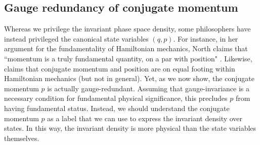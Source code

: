\documentclass[letterpaper]{article}
\begin{document}
\subsection{Gauge redundancy of conjugate momentum}
\label{gauge_momentum}


Whereas we privilege the invariant phase space density, some philosophers have instead privileged the canonical state variables $(q, p)$. For instance, in her argument for the fundamentality of Hamiltonian mechanics, North claims that ``momentum is a truly fundamental quantity, on a par with position" \parencites*[77]{North}. Likewise, \textcites[164,171]{Wallace} claims that conjugate momentum and position are on equal footing within Hamiltonian mechanics (but not in general). Yet, as we now show, the conjugate momentum $p$ is actually gauge-redundant. Assuming that gauge-invariance is a necessary condition for fundamental physical significance, this precludes $p$ from having fundamental status. Instead, we should understand the conjugate momentum $p$ as a label that we can use to express the invariant density over states. In this way, the invariant density is more physical than the state variables themselves. 
\end{document}
